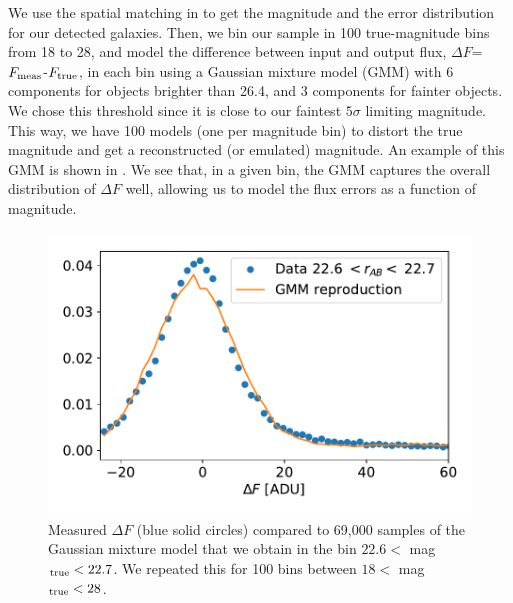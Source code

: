 \documentclass[twocolumn]{aastex62}
\begin{document}
We use the spatial matching in  to get the magnitude and the error distribution for our detected galaxies. Then, we bin our sample in 100 true-magnitude bins from 18 to 28, and model the difference between input and output flux, $\Delta F$=$F_{\rm meas}$-$F_{\rm true}$, in each bin using a Gaussian mixture model (GMM) with 6 components for objects brighter than 26.4, and 3 components for fainter objects. We chose this threshold since it is close to our faintest $5\sigma$ limiting magnitude. This way, we have 100 models (one per magnitude bin) to distort the true magnitude and get a reconstructed (or emulated) magnitude. An example of this GMM is shown in . We see that, in a given bin, the GMM captures the overall distribution of $\Delta F$ well, allowing us to model the flux errors as a function of magnitude.
\begin{figure}
\centering
\includegraphics[width=0.9\columnwidth]{example_GMM}
\caption{Measured $\Delta F$ (blue solid circles) compared to 69,000 samples of the Gaussian mixture model that we obtain in the bin $22.6 <$ mag$_{\rm true} < 22.7$. We repeated this for 100 bins between $18 <$ mag$_{\rm true} < 28$.}
\label{fig:example_GMM}
\end{figure}
\end{document}
